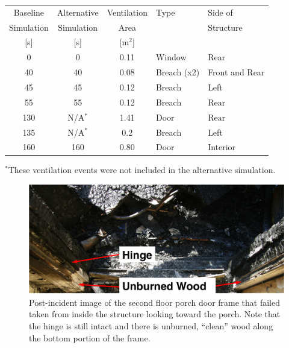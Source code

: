 \begin{table}[h!]
\centering
{}\label{tab:vents}
\begin{tabular}{cccll}
\toprule[1.5pt]
Baseline    &  Alternative  &  Ventilation  &  Type         &  Side of         \\
Simulation  &  Simulation   &  Area         &               &  Structure       \\
{[s]}       &  {[s]}        &  [m$^2$]      &               &                  \\
\midrule
0           &  0            &  0.11         &  Window       &  Rear            \\
40          &  40           &  0.08         &  Breach (x2)  &  Front and Rear  \\
45          &  45           &  0.12         &  Breach       &  Left            \\
55          &  55           &  0.12         &  Breach       &  Rear            \\
130         &  N/A$^*$      &  1.41         &  Door         &  Rear            \\
135         &  N/A$^*$      &  0.2          &  Breach       &  Left            \\
160         &  160          &  0.80         &  Door         &  Interior        \\
\bottomrule[1.25pt]
\end{tabular}\par
\footnotesize
$^*$These ventilation events were not included in the alternative simulation.
\normalsize
\end{table}

\begin{figure}[!ht]
\centering
\includegraphics[width=.80\textwidth]{../Figures/door_frame_burn}
\caption[Post-incident image of rear porch door frame.]{Post-incident image of the second floor porch door frame that failed taken from inside the structure looking toward the porch. Note that the hinge is still intact and there is unburned, ``clean'' wood along the bottom portion of the frame.}
\label{fig:door_frame}
\end{figure}

